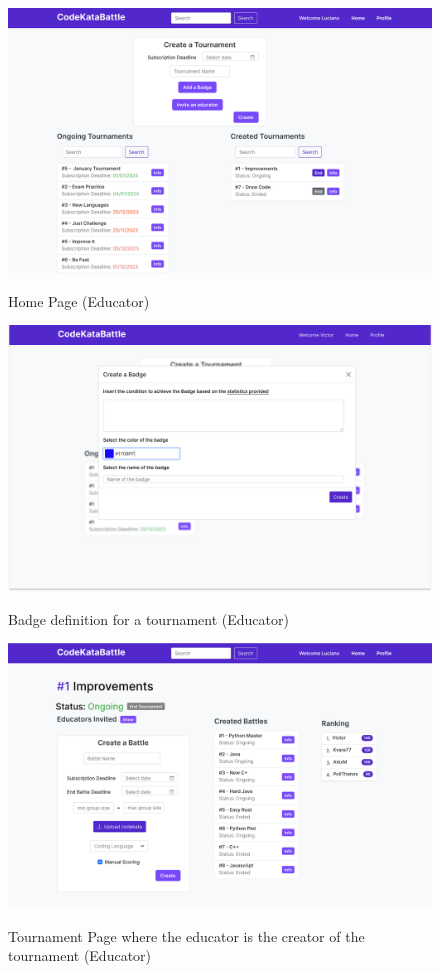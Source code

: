 \documentclass{Configuration_Files/Template}
\begin{document}
\begin{figure}[H]
\centering
\includegraphics[scale = 0.25]{Images/UI/MainPageEducator.png}\\
\caption{Home Page (Educator)}
\end{figure}

\begin{figure}[H]
\centering
\includegraphics[scale = 0.25]{Images/UI/MainPageEducator-1.png}\\
\caption{Badge definition for a tournament (Educator)}
\end{figure}

\begin{figure}[H]
\centering
\includegraphics[scale = 0.25]{Images/UI/TournamentPage_EducatorCreator.png}\\
\caption{Tournament Page where the educator is the creator of the tournament (Educator)}
\end{figure}
\end{document}
